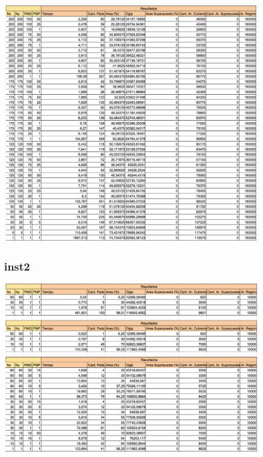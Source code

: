 \begin{center}
\includegraphics[width=1\textwidth]{imagenes/GML_45G400x400_pocos}
\end{center}

\subsection{inst2}

\begin{center}
\includegraphics[width=1\textwidth]{imagenes/ALL_inst2}
\end{center}

